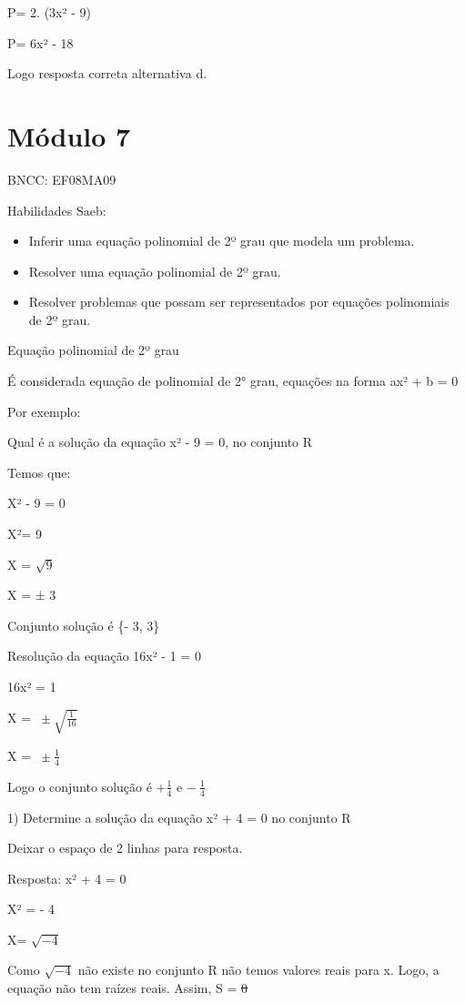 P= 2. (3x² - 9)

P= 6x² - 18

Logo resposta correta alternativa d.

\hypertarget{muxf3dulo-7}{%
\section{Módulo 7}\label{muxf3dulo-7}}

BNCC: EF08MA09

Habilidades Saeb:

\begin{itemize}
\item
  Inferir uma equação polinomial de 2º grau que modela um problema.
\item
  Resolver uma equação polinomial de 2º grau.
\item
  Resolver problemas que possam ser representados por equações
  polinomiais de 2º grau.
\end{itemize}

Equação polinomial de 2º grau

É considerada equação de polinomial de 2° grau, equações na forma ax² +
b = 0

Por exemplo:

Qual é a solução da equação x² - 9 = 0, no conjunto R

Temos que:

X² - 9 = 0

X²= 9

X = \(\sqrt{9}\)

X = ± 3

Conjunto solução é \{- 3, 3\}

Resolução da equação 16x² - 1 = 0

16x² = 1

X = \(\  \pm \sqrt{\frac{1}{16}}\)

X = \(\  \pm \frac{1}{4}\)

Logo o conjunto solução é \(+ \frac{1}{4}\) e \(- \ \frac{1}{4}\)


1) Determine a solução da equação x² + 4 = 0 no conjunto R

Deixar o espaço de 2 linhas para resposta.

Resposta: x² + 4 = 0

X² = - 4

X= \(\sqrt{- 4}\)

Como \(\sqrt{- 4}\) não existe no conjunto R não temos valores reais
para x. Logo, a equação não tem raízes reais. Assim, S = \sout{0}

